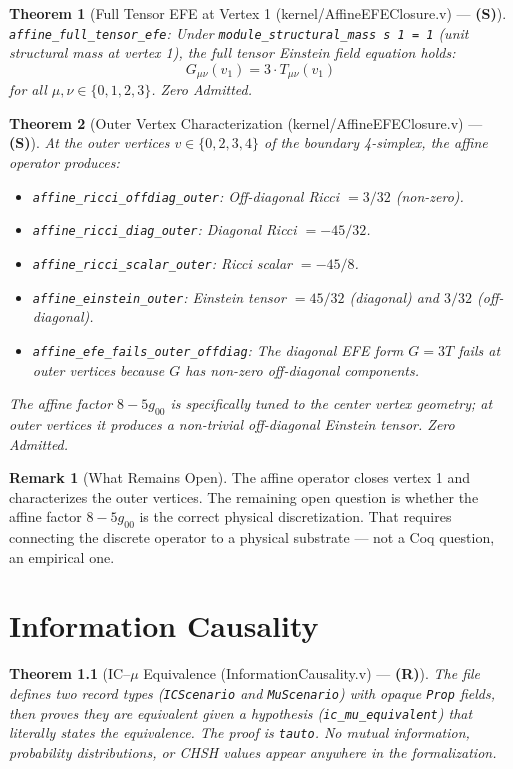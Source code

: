 \documentclass[11pt, a4paper]{report}
\theoremstyle{definition}
\newtheorem{remark}{Remark}[chapter]
\theoremstyle{plain}
\newtheorem{theorem}{Theorem}[chapter]
\begin{document}
\begin{theorem}[Full Tensor EFE at Vertex 1 {\normalfont (kernel/AffineEFEClosure.v)} --- \textbf{(S)}]
\texttt{affine\_full\_tensor\_efe}: Under \texttt{module\_structural\_mass s 1 = 1} (unit structural mass at vertex 1), the full tensor Einstein field equation holds:
\[ G_{\mu\nu}(v_1) = 3 \cdot T_{\mu\nu}(v_1) \]
for all $\mu, \nu \in \{0,1,2,3\}$. Zero Admitted.
\end{theorem}

\begin{theorem}[Outer Vertex Characterization {\normalfont (kernel/AffineEFEClosure.v)} --- \textbf{(S)}]
At the outer vertices $v \in \{0,2,3,4\}$ of the boundary 4-simplex, the affine operator produces:
\begin{itemize}
    \item \texttt{affine\_ricci\_offdiag\_outer}: Off-diagonal Ricci $= 3/32$ (non-zero).
    \item \texttt{affine\_ricci\_diag\_outer}: Diagonal Ricci $= -45/32$.
    \item \texttt{affine\_ricci\_scalar\_outer}: Ricci scalar $= -45/8$.
    \item \texttt{affine\_einstein\_outer}: Einstein tensor $= 45/32$ (diagonal) and $3/32$ (off-diagonal).
    \item \texttt{affine\_efe\_fails\_outer\_offdiag}: The diagonal EFE form $G = 3T$ fails at outer vertices because $G$ has non-zero off-diagonal components.
\end{itemize}
The affine factor $8 - 5g_{00}$ is specifically tuned to the center vertex geometry; at outer vertices it produces a non-trivial off-diagonal Einstein tensor. Zero Admitted.
\end{theorem}

\begin{remark}[What Remains Open]
The affine operator closes vertex 1 and characterizes the outer vertices. The remaining open question is whether the affine factor $8 - 5g_{00}$ is the correct physical discretization. That requires connecting the discrete operator to a physical substrate — not a Coq question, an empirical one.
\end{remark}

\chapter{Information Causality}

\begin{theorem}[IC--$\mu$ Equivalence {\normalfont (InformationCausality.v)} --- \textbf{(R)}]
The file defines two record types (\texttt{ICScenario} and \texttt{MuScenario}) with opaque \texttt{Prop} fields, then proves they are equivalent \emph{given} a hypothesis (\texttt{ic\_mu\_equivalent}) that literally states the equivalence. The proof is \texttt{tauto}. No mutual information, probability distributions, or CHSH values appear anywhere in the formalization.
\end{theorem}
\end{document}
